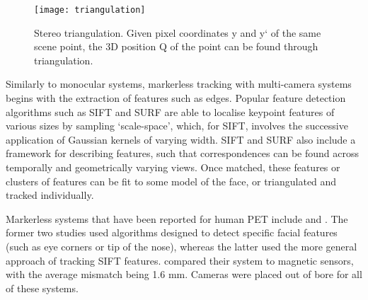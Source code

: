 \documentclass[class=article, crop=false]{standalone}
\begin{document}
\begin{figure}
	\centering
	\texttt{[image: triangulation]}
	\caption{Stereo triangulation. Given pixel coordinates y and y` of the same scene point, the 3D position Q of the point can be found through triangulation.}
	\label{triangulation}
\end{figure}

\par 
Similarly to monocular systems, markerless tracking with multi-camera systems begins with the extraction of features such as edges. Popular feature detection algorithms such as SIFT \parencite{Lowe2004} and SURF \parencite{Bay2008} are able to localise keypoint features of various sizes by sampling `scale-space', which, for SIFT, involves the successive application of Gaussian kernels of varying width. SIFT and SURF  also include a framework for describing features, such that correspondences can be found across temporally and geometrically varying views. Once matched, these features or clusters of features can be fit to some model of the face, or triangulated and tracked individually.
\par 
Markerless systems that have been reported for human PET include \cite{Anishchenko2015,Gao2007} and \cite{Ma2008}. The former two studies used algorithms designed to detect specific facial features (such as eye corners or tip of the nose), whereas the latter used the more general approach of tracking SIFT features. \cite{Anishchenko2015} compared their system to magnetic sensors, with the average mismatch being 1.6 mm. Cameras were placed out of bore for all of these systems.
\par
\end{document}
